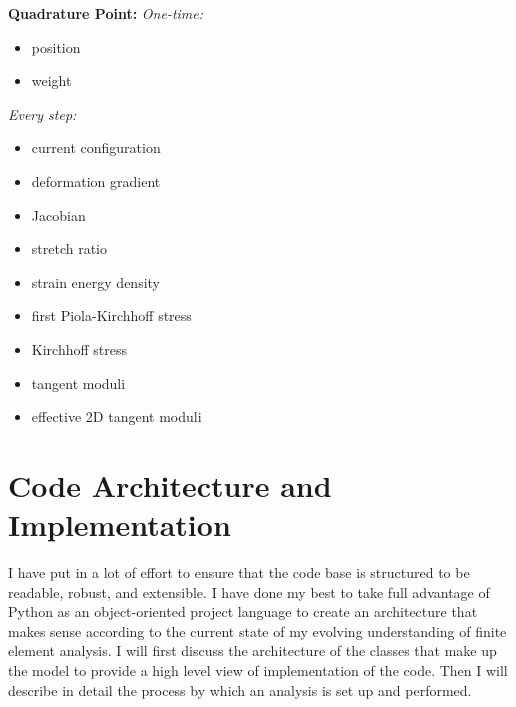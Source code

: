 \documentclass[]{spie}  %
\begin{document}
\noindent
\textbf{Quadrature Point:} \smallbreak
\textit{One-time:}
\begin{itemize}
	\item position
	\item weight
\end{itemize}
\smallbreak \textit{Every step:}
\begin{itemize}
	\item current configuration
	\item deformation gradient
	\item Jacobian
	\item stretch ratio
	\item strain energy density
	\item first Piola-Kirchhoff stress
	\item Kirchhoff stress
	\item tangent moduli
	\item effective 2D tangent moduli
\end{itemize}


\section{Code Architecture and Implementation}
I have put in a lot of effort to ensure that the code base is structured to be readable, robust, and extensible. I have done my best to take full advantage of Python as an object-oriented project language to create an architecture that makes sense according to the current state of my evolving understanding of finite element analysis. I will first discuss the architecture of the classes that make up the model to provide a high level view of implementation of the code. Then I will describe in detail the process by which an analysis is set up and performed. 
\end{document}

